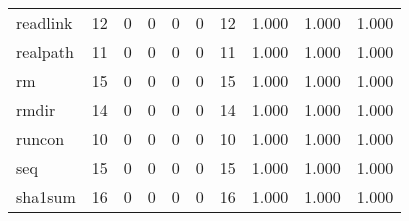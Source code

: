 \begin{longtable}{lp{2.0cm}p{2.0cm}p{2.0cm}p{2.0cm}p{2.0cm}p{2.0cm}p{2.0cm}p{2.0cm}p{2.0cm}}
readlink  &                     12 &                                             0 &                                            0 &                                           0 &                                            0 &                                         12 &                                1.000 &                                  1.000 &                                1.000 \\
realpath  &                     11 &                                             0 &                                            0 &                                           0 &                                            0 &                                         11 &                                1.000 &                                  1.000 &                                1.000 \\
rm        &                     15 &                                             0 &                                            0 &                                           0 &                                            0 &                                         15 &                                1.000 &                                  1.000 &                                1.000 \\
rmdir     &                     14 &                                             0 &                                            0 &                                           0 &                                            0 &                                         14 &                                1.000 &                                  1.000 &                                1.000 \\
runcon    &                     10 &                                             0 &                                            0 &                                           0 &                                            0 &                                         10 &                                1.000 &                                  1.000 &                                1.000 \\
seq       &                     15 &                                             0 &                                            0 &                                           0 &                                            0 &                                         15 &                                1.000 &                                  1.000 &                                1.000 \\
sha1sum   &                     16 &                                             0 &                                            0 &                                           0 &                                            0 &                                         16 &                                1.000 &                                  1.000 &                                1.000 \\

\end{longtable}
